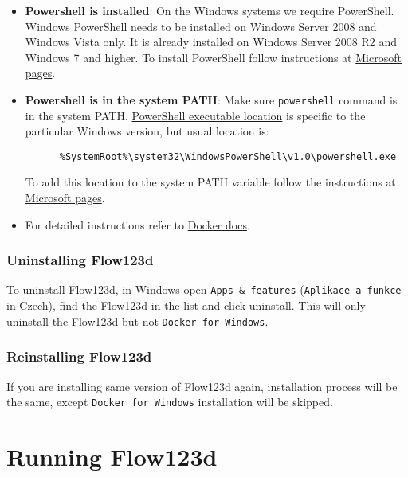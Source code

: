 \begin{itemize}
  \item \textbf{Powershell is installed}: On the Windows systems we require PowerShell. Windows PowerShell needs to be installed on Windows Server 2008 and Windows Vista only.
  It is already installed on Windows Server 2008 R2 and Windows 7 and higher. To install PowerShell follow instructions at
  \href{https://msdn.microsoft.com/en-us/powershell/scripting/setup/installing-windows-powershell}{Microsoft pages}.

  \item \textbf{Powershell is in the system PATH}: Make sure \verb'powershell' command is in the system PATH.
  \href{http://www.powershelladmin.com/wiki/PowerShell_Executables_File_System_Locations}{PowerShell executable location}
   is specific to the particular Windows version, but usual location is:
   \begin{verbatim}
      %SystemRoot%\system32\WindowsPowerShell\v1.0\powershell.exe
   \end{verbatim}
   To add this location to the system PATH variable follow the instructions at
   \href{https://msdn.microsoft.com/en-us/library/office/ee537574(v=office.14).aspx}{Microsoft pages}.

   \item For detailed instructions refer to \href{https://docs.docker.com/docker-for-windows/}{Docker docs}.
\end{itemize}


\subsubsection{Uninstalling Flow123d}
To uninstall Flow123d, in Windows open \verb'Apps & features' (\verb'Aplikace a funkce' in Czech), find the Flow123d in the list
and click uninstall. This will only uninstall the Flow123d but not \verb'Docker for Windows'.


\subsubsection{Reinstalling Flow123d}
\label{duplicit-image}
If you are installing same version of Flow123d again, installation process will be the same,
except \verb'Docker for Windows' installation will be skipped.


\section{Running Flow123d}
